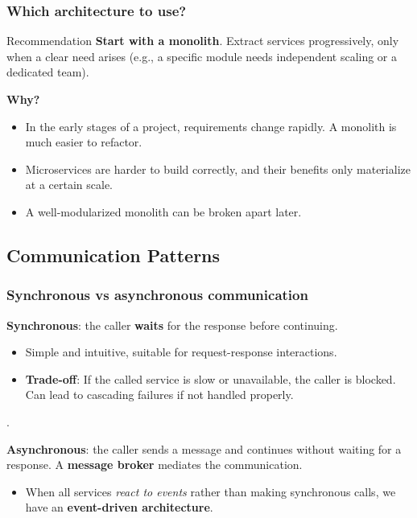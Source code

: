 \documentclass{beamer}
\begin{document}
\begin{frame}
  \frametitle{Which architecture to use?}

  \begin{block}{Recommendation}
    \textbf{Start with a monolith}. Extract services progressively, only when a clear need arises (e.g., a specific module needs independent scaling or a dedicated team).
  \end{block}

  \textbf{Why?}
  \begin{itemize}
    \item In the early stages of a project, requirements change rapidly. A monolith is much easier to refactor.
    \item Microservices are harder to build correctly, and their benefits only materialize at a certain scale.
    \item A well-modularized monolith can be broken apart later.
  \end{itemize}

\end{frame}

\subsection{Communication Patterns}

\begin{frame}
  \frametitle{Synchronous vs asynchronous communication}

  \textbf{Synchronous}: the caller \textbf{waits} for the response before continuing.

  \begin{itemize}
    \item Simple and intuitive, suitable for request-response interactions.
    \item \textbf{Trade-off}: If the called service is slow or unavailable, the caller is blocked. Can lead to cascading failures if not handled properly.
  \end{itemize}
  {\color{white} . }

  \textbf{Asynchronous}: the caller sends a message and continues without waiting for a response. A \textbf{message broker} mediates the communication.
  \begin{itemize}
    \item When all services \textit{react to events} rather than making synchronous calls, we have an \textbf{event-driven architecture}.
  \end{itemize}

\end{frame}
\end{document}

